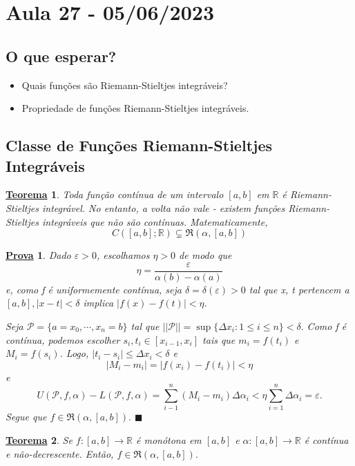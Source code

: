 \documentclass{article}
\newtheorem*{theorem*}{\underline{Teorema}}
\newtheorem*{proof*}{\underline{Prova}}
\renewcommand\qedsymbol{$\blacksquare$}
\begin{document}
\section{Aula 27 - 05/06/2023}
\subsection{O que esperar?}
\begin{itemize}
  \item Quais fun\c cões são Riemann-Stieltjes integráveis?
  \item Propriedade de fun\c cões Riemann-Stieltjes integráveis.
\end{itemize}
\subsection{Classe de Fun\c cões Riemann-Stieltjes Integráveis}
\begin{theorem*}
  Toda fun\c cão contínua de um intervalo \([a, b]\) em \(\mathbb{R}\) é Riemann-Stieltjes
integrável. No entanto, a volta não vale - existem fun\c cões Riemann-Stieltjes integráveis que
não são contínuas. Matematicamente, 
  \[
    C([a, b]; \mathbb{R})\subsetneq{\mathfrak{R}(\alpha , [a,b])}
  \]
\end{theorem*}
\begin{proof*}
  Dado \(\varepsilon >0\), escolhamos \(\eta >0\) de modo que 
    \[
      \eta = \frac{\varepsilon }{\alpha (b) - \alpha (a)}
    \]
  e, como f é uniformemente contínua, seja \(\delta =\delta (\varepsilon ) > 0\) tal que
x, t pertencem a \([a, b], |x-t| < \delta \) implica \(|f(x)-f(t)| < \eta \).

  Seja \(\mathcal{P} = \{a=x_{0}, \cdots, x_{n} =b \}\) tal que \(||\mathcal{P}||=\sup\{\Delta x_{i}: 1\leq i\leq n\} < \delta.\)
Como f é contínua, podemos escolher \(s_{i},t_{i}\in[x_{i-1}, x_{i}]\) tais que 
 \(m_{i}=f(t_{i})\) e \(M_{i}=f(s_{i})\). Logo, \(|t_{i}-s_{i}|\leq \Delta x_{i} < \delta \) e 
   \[
     |M_{i}-m_{i}| = |f(x_{i}) - f(t_{i})| < \eta 
   \]
   e 
     \[
       U(\mathcal{P}, f, \alpha ) - L(\mathcal{P}, f, \alpha ) = \sum\limits_{i-1}^{n}(M_{i}-m_{i})\Delta \alpha_{i} < \eta \sum\limits_{i=1}^{n}\Delta \alpha_{i} = \varepsilon .
     \]
  Segue que \(f\in \mathfrak{R}(\alpha , [a, b]).\) \qedsymbol
\end{proof*}
\begin{theorem*}
  Se \(f:[a, b]\rightarrow \mathbb{R}\) é monótona em \([a, b]\) e \(\alpha :[a, b]\rightarrow \mathbb{R}\) é
contínua e não-decrescente. Então, \(f\in \mathfrak{R}(\alpha, [a,b]).\)
\end{theorem*}
\end{document}

